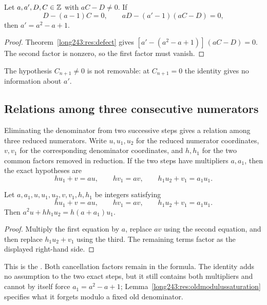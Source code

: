 \documentclass[11pt]{article}
\begin{document}
\begin{theorem}\label{long243:res:step}
Let $a,a',D,C\in\mathbb{Z}$ with $aC-D\ne0$. If
\[
 D-(a-1)C=0,\qquad aD-(a'-1)(aC-D)=0,
\]
then $a'=a^2-a+1$.
\end{theorem}

\begin{proof}
Theorem~\ref{long243:res:defect} gives
$[a'-(a^2-a+1)]\,(aC-D)=0$. The second factor is nonzero, so the first
factor must vanish.
\end{proof}

  The hypothesis $C_{n+1}\ne0$ is not removable: at $C_{n+1}=0$
the identity gives no information about $a'$.

\subsection{Relations among three consecutive numerators}

Eliminating the denominator from two successive steps gives a relation
among three reduced numerators.  Write $u,u_1,u_2$ for the
reduced numerator coordinates, $v,v_1$ for the corresponding denominator
coordinates, and $h,h_1$ for the two common factors removed in reduction.  If
the two steps have multipliers $a,a_1$, then the exact hypotheses are
\[
 hu_1+v=au,\qquad hv_1=av,\qquad
 h_1u_2+v_1=a_1u_1.
\]

\begin{theorem}\label{long243:res:secondorder}
Let $a,a_1,u,u_1,u_2,v,v_1,h,h_1$ be integers satisfying
\[
 hu_1+v=au,\qquad hv_1=av,\qquad h_1u_2+v_1=a_1u_1.
\]
Then $a^2u+hh_1u_2=h(a+a_1)u_1$.
\end{theorem}

\begin{proof}
Multiply the first equation by $a$, replace $av$ using the second equation,
and then replace $h_1u_2+v_1$ using the third.  The remaining terms factor as
the displayed right-hand side.
\end{proof}

\noindent This is the
.  Both cancellation factors remain in the formula. The identity adds no
assumption to the two exact steps, but it still contains both multipliers
and cannot by itself force $a_1=a^2-a+1$;
Lemma~\ref{long243:res:oldmodulussaturation} specifies what it forgets
modulo a fixed old denominator.
\end{document}
